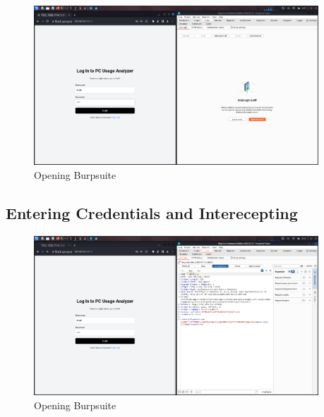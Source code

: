 \documentclass[11pt]{article}
\begin{document}
\begin{figure}[H]
    \centering
    \includegraphics[width=0.95\textwidth]{burpsuite (2).png}
    \caption{Opening Burpsuite}
    \label{fig:1}
\end{figure}
\subsection{Entering Credentials and Interecepting}




\begin{figure}[H]
    \centering
    \includegraphics[width=0.95\textwidth]{burpsuite (3).png}
    \caption{Opening Burpsuite}
    \label{fig:1}
\end{figure}
\end{document}
